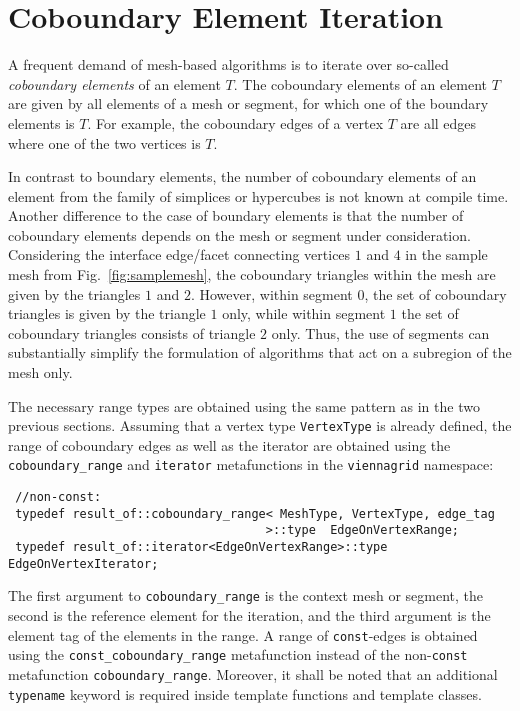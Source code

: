\section{Coboundary Element Iteration}
A frequent demand of mesh-based algorithms is to iterate over so-called \emph{coboundary elements} of an element $T$.
The coboundary elements of an element $T$ are given by all elements of a mesh or segment, for which one of the boundary elements is $T$.
For example, the coboundary edges of a vertex $T$ are all edges where one of the two vertices is $T$.

In contrast to boundary elements, the number of coboundary elements of an element from the family of simplices or hypercubes is not known at compile time.
Another difference to the case of boundary elements is that the number of coboundary elements depends on the mesh or segment under consideration.
Considering the interface edge/facet connecting vertices $1$ and $4$ in the sample mesh from Fig.~\ref{fig:samplemesh}, the coboundary triangles within the mesh are given by the triangles $1$ and $2$.
However, within segment $0$, the set of coboundary triangles is given by the triangle $1$ only, while within segment $1$ the set of coboundary triangles consists of triangle $2$ only.
Thus, the use of segments can substantially simplify the formulation of algorithms that act on a subregion of the mesh only.

The necessary range types are obtained using the same pattern as in the two previous sections.
Assuming that a vertex type \lstinline|VertexType| is already defined, the range of coboundary edges as well as the iterator are obtained
using the \lstinline|coboundary_range| and \lstinline|iterator| metafunctions in the \lstinline|viennagrid| namespace:
\begin{lstlisting}
 //non-const:
 typedef result_of::coboundary_range< MeshType, VertexType, edge_tag
                                    >::type  EdgeOnVertexRange;
 typedef result_of::iterator<EdgeOnVertexRange>::type    EdgeOnVertexIterator;
\end{lstlisting}
The first argument to \lstinline|coboundary_range| is the context mesh or segment, the second is the reference element for the iteration, and the third argument is the element tag of the elements in the range.
A range of \lstinline|const|-edges is obtained using the \lstinline|const_coboundary_range| metafunction instead of the non-\lstinline|const| metafunction \lstinline|coboundary_range|.
Moreover, it shall be noted that an additional \lstinline|typename| keyword is required inside template functions and template classes.

